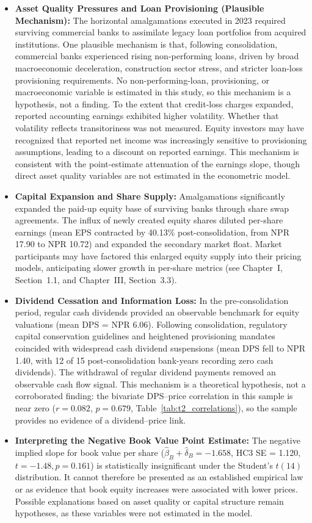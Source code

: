 \begin{itemize}
    \item \textbf{Asset Quality Pressures and Loan Provisioning (Plausible Mechanism):} The horizontal amalgamations executed in 2023 required surviving commercial banks to assimilate legacy loan portfolios from acquired institutions. One plausible mechanism is that, following consolidation, commercial banks experienced rising non-performing loans, driven by broad macroeconomic deceleration, construction sector stress, and stricter loan-loss provisioning requirements. No non-performing-loan, provisioning, or macroeconomic variable is estimated in this study, so this mechanism is a hypothesis, not a finding. To the extent that credit-loss charges expanded, reported accounting earnings exhibited higher volatility. Whether that volatility reflects transitoriness was not measured. Equity investors may have recognized that reported net income was increasingly sensitive to provisioning assumptions, leading to a discount on reported earnings. This mechanism is consistent with the point-estimate attenuation of the earnings slope, though direct asset quality variables are not estimated in the econometric model.
    \item \textbf{Capital Expansion and Share Supply:} Amalgamations significantly expanded the paid-up equity base of surviving banks through share swap agreements. The influx of newly created equity shares diluted per-share earnings (mean EPS contracted by 40.13\% post-consolidation, from NPR 17.90 to NPR 10.72) and expanded the secondary market float. Market participants may have factored this enlarged equity supply into their pricing models, anticipating slower growth in per-share metrics (see Chapter~I, Section~1.1, and Chapter~III, Section~3.3).
    \item \textbf{Dividend Cessation and Information Loss:} In the pre-consolidation period, regular cash dividends provided an observable benchmark for equity valuations (mean DPS = NPR 6.06). Following consolidation, regulatory capital conservation guidelines and heightened provisioning mandates coincided with widespread cash dividend suspensions (mean DPS fell to NPR 1.40, with 12 of 15 post-consolidation bank-years recording zero cash dividends). The withdrawal of regular dividend payments removed an observable cash flow signal. This mechanism is a theoretical hypothesis, not a corroborated finding: the bivariate DPS--price correlation in this sample is near zero ($r = 0.082$, $p = 0.679$, Table~\ref{tab:t2_correlations}), so the sample provides no evidence of a dividend--price link.
    \item \textbf{Interpreting the Negative Book Value Point Estimate:} The negative implied slope for book value per share ($\hat{\beta}_B + \hat{\delta}_B = -1.658$, HC3 SE = 1.120, $t = -1.48, p = 0.161$) is statistically insignificant under the Student's $t(14)$ distribution. It cannot therefore be presented as an established empirical law or as evidence that book equity increases were associated with lower prices. Possible explanations based on asset quality or capital structure remain hypotheses, as these variables were not estimated in the model.
\end{itemize}

